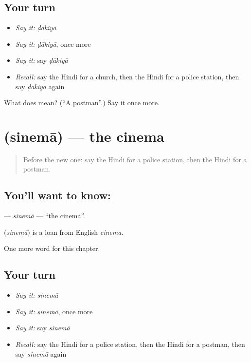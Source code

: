 \subsection*{Your turn}
\begin{itemize}
\raggedright
  \item \emph{Say it:} \emph{ḍākiyā}
  \item \emph{Say it:} \emph{ḍākiyā}, once more
  \item \emph{Say it:} say \emph{ḍākiyā}
  \item \emph{Recall:} say the Hindi for a church, then the Hindi for a police station, then say \emph{ḍākiyā} again
\end{itemize}

\begin{tcolorbox}[breakable,colback=teal!4,colframe=teal!35!black,title={Before you move on}]
What does  mean? (\textquotedblleft{}A postman\textquotedblright{}.) Say it once more.
\end{tcolorbox}
\section[\texorpdfstring{\hi{सिनेमा} (sinemā)}{सिनेमा (sinemā)}]{ (sinemā) — the cinema}

\label{lesson:HI-C187-sinema}



\begin{quote}
Before the new one: say the Hindi for a police station, then the Hindi for a postman.
\end{quote}

\subsection*{You'll want to know: }
\textbf{} — \emph{sinemā} — \textquotedblleft{}the cinema\textquotedblright{}.

\begin{cousinweb}
\textbf{} (\emph{sinemā}) is a loan from English \emph{cinema}.
\end{cousinweb}

\begin{grammarlens}[title={What you've built}]
One more word for this chapter.
\end{grammarlens}

\subsection*{Your turn}
\begin{itemize}
\raggedright
  \item \emph{Say it:} \emph{sinemā}
  \item \emph{Say it:} \emph{sinemā}, once more
  \item \emph{Say it:} say \emph{sinemā}
  \item \emph{Recall:} say the Hindi for a police station, then the Hindi for a postman, then say \emph{sinemā} again
\end{itemize}

